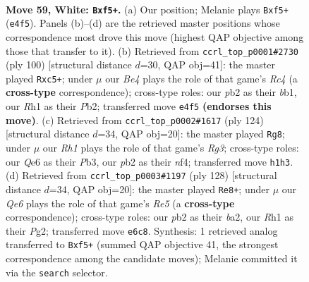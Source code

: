 \documentclass[11pt]{article}
\begin{document}
\clearpage

\begin{figure}[p]\centering
\begin{subfigure}{0.46\textwidth}\centering
\resizebox{\linewidth}{!}{%
\newchessgame
\chessboard[
  setfen={8/7k/4Q3/5r2/4B2P/8/1p4P1/6KR w - - 1 59},
  showmover=false,
  pgfstyle=straightmove, color=movearrow, markmove={e4-f5}
]}
\caption{}
\end{subfigure}\hfill
\begin{subfigure}{0.46\textwidth}\centering
\resizebox{\linewidth}{!}{%
\newchessgame
\chessboard[
  setfen={8/5p2/p1k5/2r5/P1R2B2/1K6/1P6/1b6 w - - 3 51},
  showmover=false,
  pgfstyle=straightmove, color=movearrow, markmove={c4-c5}
]}
\caption{}
\end{subfigure}
\\[4pt]
\begin{subfigure}{0.46\textwidth}\centering
\resizebox{\linewidth}{!}{%
\newchessgame
\chessboard[
  setfen={8/8/5k2/3r4/2B2n2/1PK3R1/8/8 w - - 0 63},
  showmover=false,
  pgfstyle=straightmove, color=movearrow, markmove={g3-g8}
]}
\caption{}
\end{subfigure}\hfill
\begin{subfigure}{0.46\textwidth}\centering
\resizebox{\linewidth}{!}{%
\newchessgame
\chessboard[
  setfen={6k1/8/8/3rR1B1/8/5PK1/b5P1/8 w - - 7 65},
  showmover=false,
  pgfstyle=straightmove, color=movearrow, markmove={e5-e8}
]}
\caption{}
\end{subfigure}
\caption{\textbf{Move 59, White: \texttt{Bxf5+}.} (a) Our position; Melanie plays \texttt{Bxf5+} (\texttt{e4f5}). Panels (b)--(d) are the retrieved master positions whose correspondence most drove this move (highest QAP objective among those that transfer to it). (b) Retrieved from \texttt{ccrl\_top\_p0001\#2730} (ply 100) [structural distance $d$=30, QAP obj=41]: the master played \texttt{Rxc5+}; under $\mu$ our \emph{Be4} plays the role of that game's \emph{Rc4} (a \textbf{cross-type} correspondence); cross-type roles: our \emph{p}b2 as their \emph{b}b1, our \emph{R}h1 as their \emph{P}b2; transferred move \texttt{e4f5} \textbf{(endorses this move)}. (c) Retrieved from \texttt{ccrl\_top\_p0002\#1617} (ply 124) [structural distance $d$=34, QAP obj=20]: the master played \texttt{Rg8}; under $\mu$ our \emph{Rh1} plays the role of that game's \emph{Rg3}; cross-type roles: our \emph{Q}e6 as their \emph{P}b3, our \emph{p}b2 as their \emph{n}f4; transferred move \texttt{h1h3}. (d) Retrieved from \texttt{ccrl\_top\_p0003\#1197} (ply 128) [structural distance $d$=34, QAP obj=20]: the master played \texttt{Re8+}; under $\mu$ our \emph{Qe6} plays the role of that game's \emph{Re5} (a \textbf{cross-type} correspondence); cross-type roles: our \emph{p}b2 as their \emph{b}a2, our \emph{R}h1 as their \emph{P}g2; transferred move \texttt{e6c8}. Synthesis: 1 retrieved analog transferred to \texttt{Bxf5+} (summed QAP objective 41, the strongest correspondence among the candidate moves); Melanie committed it via the \texttt{search} selector.}
\label{fig:thought-m116}
\end{figure}
\end{document}
